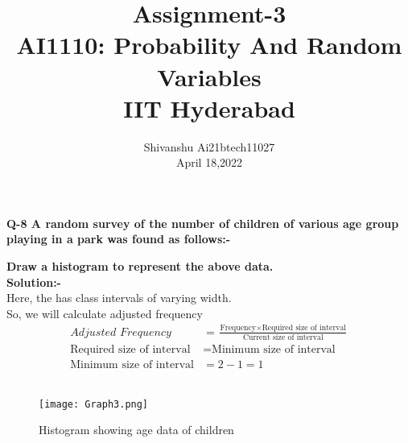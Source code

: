\documentclass[12pt]{IEEEtran}
\title{\textbf{Assignment-3}\\ \large AI1110: Probability And Random Variables\\ IIT Hyderabad}
\author{Shivanshu  Ai21btech11027\\ April 18,2022}
\begin{document}
    \maketitle
    \textbf{Q-8 A random survey of the number of children of various age group playing in a park was found as follows:-}\\
   
    \begin{center}
        
    \end{center}
    \textbf{Draw a histogram to represent the above data.}\\
    
    \textbf{Solution:-}\\
    Here, the has class intervals of varying width.\\
    So, we will calculate adjusted frequency\\

    \begin{align}
        \textit{Adjusted Frequency} &= \tfrac{ \text{Frequency} \times \text{Required size of interval}}{\text{Current size of interval}}\\
        \text{Required size of interval} &= \text{Minimum size of interval}\\
        \text{Minimum size of interval} &= 2-1 =1
    \end{align}\\
    
    
    \begin{center}
        
    \end{center}
    
    \begin{center}
        
        \label{table:table_3}
    \end{center}
    
    \begin{figure}[h]
        \centering
        \texttt{[image: Graph3.png]}
        \caption{Histogram showing age data of children}
        \label{fig.}
    \end{figure}
    
\end{document}
